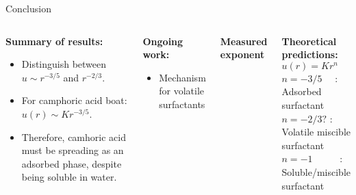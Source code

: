 \documentclass[compress,10pt,dvipsnames,svgnames,pdftex]{beamer}
\begin{document}
\begin{frame}{Conclusion}
\begin{columns}
\column{6cm}
\begin{mdframed}[style=MyFrame]
{\scriptsize 
{\bf Summary of results:} \\
\begin{itemize}
 \item Distinguish between $u \sim r^{-3/5}$ and $r^{-2/3}$.
 \item For camphoric acid boat: $u(r) \sim K r^{-3/5}$.
 \item Therefore, camhoric acid must be spreading as an adsorbed phase, despite being soluble in water.
\end{itemize}
}
\end{mdframed}

\begin{mdframed}[style=MyFrame]
{\scriptsize 
{\bf Ongoing work:} \\
\begin{itemize}
 \item Mechanism for volatile surfactants
\end{itemize}
}


\end{mdframed}
\centerline{
}

\column{6cm}
\begin{mdframed}[style=MyFrame]
{\scriptsize
\centerline{\bf Measured exponent}
\centerline{}
}
\end{mdframed}
\begin{mdframed}[style=MyFrame]
{\scriptsize 
{\bf Theoretical predictions: $u(r) = K r^n$} \\
{\scriptsize
$n=-3/5$ ~~: Adsorbed surfactant \\[-1mm]
$n=-2/3?$ : Volatile miscible surfactant \\[-1mm]
$n=-1$ ~~~~~: Soluble/miscible surfactant
}
}
\end{mdframed}
\end{columns}

\end{frame}
\end{document}
